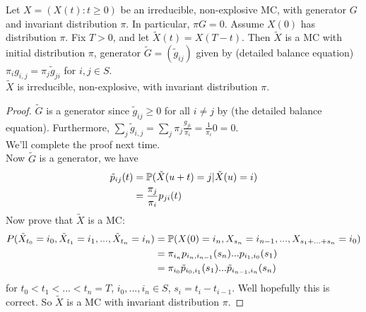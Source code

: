 \documentclass[a4paper]{article}
\begin{document}
\begin{thm}
Let $X=(X(t):t \geq 0)$ be an irreducible, non-explosive MC, with generator $G$ and invariant distribution $\pi$. In particular, $\pi G = 0$. Assume $X(0)$ has distribution $\pi$. Fix $T>0$, and let $\tilde{X}(t) = X(T-t)$. Then $\tilde{X}$ is a MC with initial distribution $\pi$, generator $\tilde{G} = (\tilde{g}_{ij})$ given by (detailed balance equation) $\pi_i g_{i,j} = \pi_j \tilde{g}_{ji}$ for $i,j \in S$.\\
$\tilde{X}$ is irreducible, non-explosive, with invariant distribution $\pi$.
\begin{proof}
$\tilde{G}$ is a generator since $\tilde{g}_{ij} \geq 0$ for all $i \neq j$ by (the detailed balance equation). Furthermore, $\sum_j \tilde{g}_{i,j} = \sum_j \pi_j \frac{g_{ji}}{\pi_i} = \frac{1}{\pi_i} 0 = 0$.\\
We'll complete the proof next time.\\
Now $\tilde{G}$ is a generator, we have
\begin{equation*}
\begin{aligned}
\tilde{p}_{ij} (t) &= \P (\tilde{X}(u+t) = j | \tilde{X}(u) = i)\\
&= \frac{\pi_j}{\pi_i} p_{ji}(t)
\end{aligned}
\end{equation*}
Now prove that $\tilde{X}$ is a MC:
\begin{equation*}
\begin{aligned}
P(\tilde{X}_{t_0} = i_0,\tilde{X}_{t_1} = i_1,...,\tilde{X}_{t_n} = i_n) &= \P(X(0) = i_n,X_{s_n} = i_{n-1},...,X_{s_1+...+s_n} = i_0)\\
&= \pi_{i_n} p_{i_n,i_{n-1}} (s_n)...p_{i_1,i_0} (s_1)\\
&= \pi_{i_0} \tilde{p}_{i_0,i_1} (s_1) ... \tilde{p}_{i_{n-1},i_n} (s_n)
\end{aligned}
\end{equation*}
for $t_0<t_1<...<t_n = T$, $i_0,...,i_n \in S$, $s_i = t_i - t_{i-1}$. Well hopefully this is correct. So $\tilde{X}$ is a MC with invariant distribution $\pi$.
\end{proof}
\end{thm}
\end{document}
